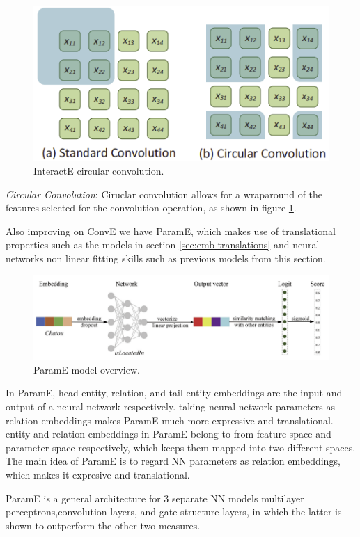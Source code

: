 \begin{figure}[!ht]
    \centering
    \includegraphics[width=.65\textwidth]{fig/embeddings/interactE_convolutions.png}
    \caption{InteractE circular convolution.}
    \label{fig:emb-interactE_conv}
\end{figure}

\textit{Circular Convolution}: Ciruclar convolution allows for a wraparound of the features selected for the convolution operation, as shown in figure \ref{fig:emb-interactE_conv}.

Also improving on ConvE we have ParamE, which makes use of translational properties such as the models in section \ref{sec:emb-translations} and neural networks non linear fitting skills such as previous models from this section.

\begin{figure}[!ht]
    \centering
    \includegraphics[width=\textwidth]{fig/embeddings/ParamE.png}
    \caption{ParamE model overview.}
    \label{fig:emb-paramE}
\end{figure}

In ParamE, head entity, relation, and tail entity embeddings are the input and output of a neural network respectively. taking neural network parameters as relation embeddings makes ParamE much more expressive and translational. entity and relation embeddings in ParamE belong to from feature space and parameter space respectively, which keeps them mapped into two different spaces. The main idea of ParamE is to regard NN parameters as relation embeddings, which makes it  expresive and translational.

ParamE is a general architecture for 3 separate NN models multilayer perceptrons,convolution layers, and gate structure layers, in which the latter is shown to outperform the other two measures.

